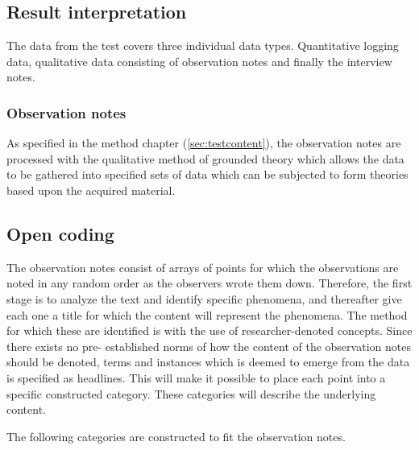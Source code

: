 \subsection{Result interpretation} \label{sec:analysisresults}
The data from the test covers three individual data types. 
Quantitative logging data, qualitative data consisting of observation notes and finally the interview notes.

\subsubsection{Observation notes}
As specified in the method chapter (\ref{sec:testcontent}), the observation notes are processed with the qualitative method of grounded theory which allows the data to be gathered into specified sets of data which can be subjected to form theories based upon the acquired material.

\subsection*{Open coding}
The observation notes consist of arrays of points for which the observations are noted in any random order as the observers wrote them down. 
Therefore, the first stage is to analyze the text and identify specific phenomena, and thereafter give each one a title for which the content will represent the phenomena. 
The method for which these are identified is with the use of researcher-denoted concepts. 
Since there exists no pre- established norms of how the content of the observation notes should be denoted, terms and instances which is deemed to emerge from the data is specified as headlines. 
This will make it possible to place each point into a specific constructed category. 
These categories will describe the underlying content.


The following categories are constructed to fit the observation notes.

